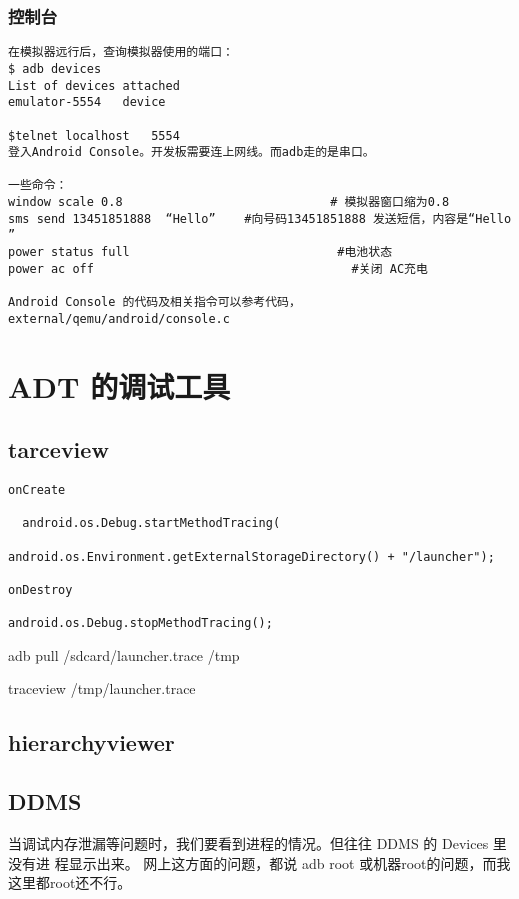 \documentclass[a4paper,titlepage]{article}
\begin{document}
\subsubsection{控制台}
\begin{verbatim}
在模拟器远行后，查询模拟器使用的端口：
$ adb devices 
List of devices attached 
emulator-5554	device

$telnet localhost   5554
登入Android Console。开发板需要连上网线。而adb走的是串口。

一些命令：
window scale 0.8                             # 模拟器窗口缩为0.8
sms send 13451851888  “Hello”    #向号码13451851888 发送短信，内容是“Hello ”
power status full                             #电池状态
power ac off                                    #关闭 AC充电

Android Console 的代码及相关指令可以参考代码，external/qemu/android/console.c
\end{verbatim}


\section{ADT 的调试工具}
\subsection{tarceview}

\begin{lstlisting}
onCreate

  android.os.Debug.startMethodTracing(
                    android.os.Environment.getExternalStorageDirectory() + "/launcher");

onDestroy

android.os.Debug.stopMethodTracing();
\end{lstlisting}

adb pull /sdcard/launcher.trace /tmp


traceview /tmp/launcher.trace

\subsection{hierarchyviewer}

\subsection{DDMS}
当调试内存泄漏等问题时，我们要看到进程的情况。但往往 DDMS 的 Devices 里没有进
程显示出来。 
网上这方面的问题，都说 adb root 或机器root的问题，而我这里都root还不行。
\end{document}
